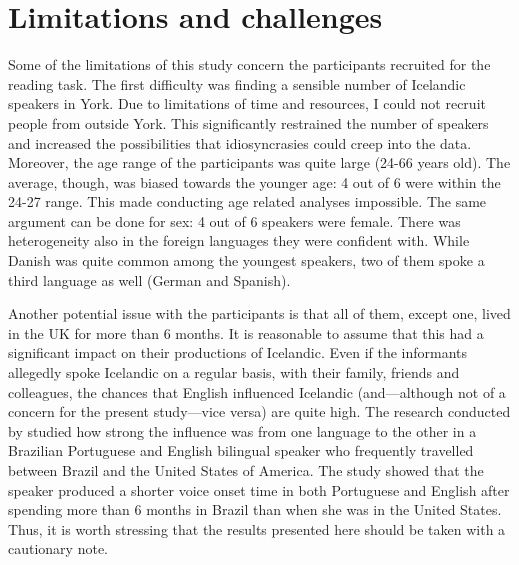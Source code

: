\documentclass[11pt,a4paper,openany]{memoir}\usepackage[]{graphicx}\usepackage[]{color}
\begin{document}
\section{Limitations and challenges}

Some of the limitations of this study concern the participants recruited for the reading task.
The first difficulty was finding a sensible number of Icelandic speakers in York.
Due to limitations of time and resources, I could not recruit people from outside York.
This significantly restrained the number of speakers and increased the possibilities that idiosyncrasies could creep into the data.
Moreover, the age range of the participants was quite large (24-66 years old).
The average, though, was biased towards the younger age: 4 out of 6 were within the 24-27 range.
This made conducting age related analyses impossible.
The same argument can be done for sex: 4 out of 6 speakers were female.
There was heterogeneity also in the foreign languages they were confident with.
While Danish was quite common among the youngest speakers, two of them spoke a third language as well (German and Spanish).

Another potential issue with the participants is that all of them, except one, lived in the UK for more than 6 months.
It is reasonable to assume that this had a significant impact on their productions of Icelandic.
Even if the informants allegedly spoke Icelandic on a regular basis, with their family, friends and colleagues, the chances that English influenced Icelandic (and---although not of a concern for the present study---vice versa) are quite high.
The research conducted by \citet{sancier1997} studied how strong the influence was from one language to the other in a Brazilian Portuguese and English bilingual speaker who frequently travelled between Brazil and the United States of America.
The study showed that the speaker produced a shorter voice onset time in both Portuguese and English after spending more than 6 months in Brazil than when she was in the United States.
Thus, it is worth stressing that the results presented here should be taken with a cautionary note.
\end{document}
